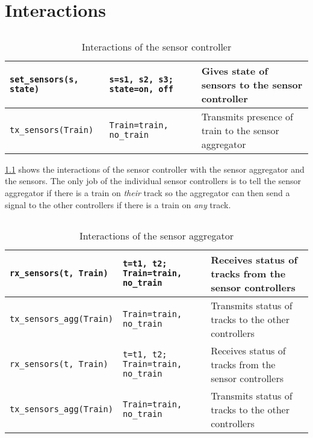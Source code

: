 \documentclass[final]{report}
\begin{document}
\chapter{Interactions}\label{ch:interactions}

\section{}
\begin{table}[H]
\centering
    \begin{tabular}{|l|l|l|}
    \hline
    \texttt{set\_sensors(s, state)} & \texttt{s=s1, s2, s3; state=on, off}  & Gives state of sensors to the sensor controller      \\ \hline
    \texttt{tx\_sensors(Train)}     & \texttt{Train=train, no\_train}       & Transmits presence of train to the sensor aggregator \\ \hline
    \end{tabular}
    \caption{Interactions of the sensor controller}
    \label{tab:sensorSignals}
\end{table}

\cref{tab:sensorSignals} shows the interactions of the sensor controller with the sensor aggregator and the sensors.
The only job of the individual sensor controllers is to tell the sensor aggregator if there is a train on \textit{their} track so the aggregator can then send a signal to the other controllers if there is a train on \textit{any} track.

\section{}
\begin{table}[H]
\centering
    \begin{tabular}{|l|l|l|}
    \hline
    \texttt{rx\_sensors(t, Train)}   & \texttt{t=t1, t2; Train=train, no\_train} & Receives status of tracks from the sensor controllers \\ \hline
    \texttt{tx\_sensors\_agg(Train)} & \texttt{Train=train, no\_train}           & Transmits status of tracks to the other controllers   \\
    \texttt{rx\_sensors(t, Train)}   & \texttt{t=t1, t2; Train=train, no\_train} & Receives status of tracks from the sensor controllers \\ \hline
    \texttt{tx\_sensors\_agg(Train)} & \texttt{Train=train, no\_train}           & Transmits status of tracks to the other controllers   \\ \hline
    \end{tabular}
\caption{Interactions of the sensor aggregator}
\label{tab:sensorAggSignals}
\end{table}
\end{document}
